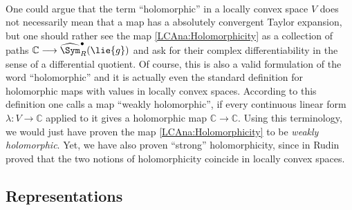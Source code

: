 \begin{remark}
	\label{LCAna:Rem:Holomorphicity} \hfill \\
	One could argue that the term ``holomorphic'' in a locally convex space 
	$V$ does not necessarily mean that a map has a absolutely convergent 
	Taylor expansion, but one should rather see the map 
	\eqref{LCAna:Holomorphicity} as a collection of paths $\mathbb{C} 
	\longrightarrow \widehat{\Sym}_R^{\bullet}(\lie{g})$ and ask for their 
	complex differentiability in the sense of a differential quotient. Of 
	course, this is also a valid formulation of the word ``holomorphic'' 
	and it is actually even the standard definition for holomorphic maps with 
	values in locally convex spaces. According to this definition one calls a map 
	``weakly holomorphic'', if every continuous linear form 
	$\lambda \colon V \longrightarrow \mathbb{C}$ applied to it gives a 
	holomorphic map $\mathbb{C} \longrightarrow \mathbb{C}$. Using this 
	terminology, we would just have proven the map \eqref{LCAna:Holomorphicity} to 
	be \emph{weakly holomorphic}. Yet, we have also
	proven ``strong'' holomorphicity, since in \cite[Theorem 3.31]{rudin:1991a} 
	Rudin proved that the two notions of holomorphicity coincide in locally convex 
	spaces.
\end{remark}



\subsection{Representations}

